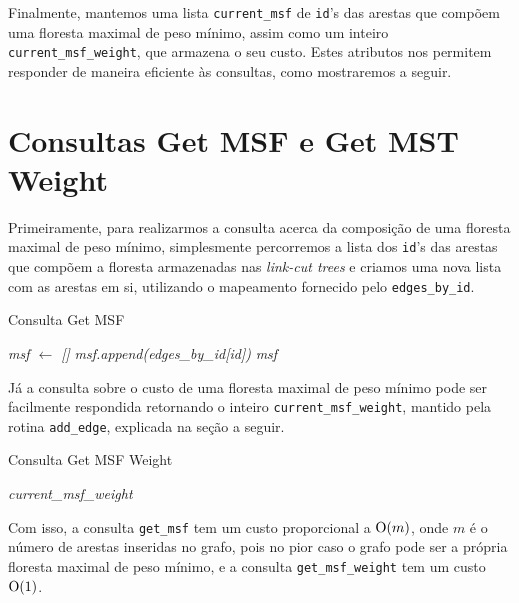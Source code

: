 Finalmente, mantemos uma lista \texttt{current\_msf} de \texttt{id}'s das arestas que compõem uma floresta maximal de peso mínimo, assim como um inteiro \texttt{current\_msf\_weight}, que armazena o seu custo. Estes atributos nos permitem responder de maneira eficiente às consultas, como mostraremos a seguir.

\section{Consultas Get MSF e Get MST Weight}
\label{sec:imsf-get-msf}

Primeiramente, para realizarmos a consulta acerca da composição de uma floresta maximal de peso mínimo, simplesmente percorremos a lista dos \texttt{id}'s das arestas que compõem a floresta armazenadas nas \emph{link-cut trees} e criamos uma nova lista com as arestas em si, utilizando o mapeamento fornecido pelo \texttt{edges\_by\_id}.

\begin{algorithm}[h!]
    \caption{Consulta Get MSF}\label{imsf-get-msf}
    \begin{algorithmic}[1]
        \State \emph{msf $\gets$ []}
        \State \emph{msf.append(edges\_by\_id[id])}
        \EndFor
        \State \Return \emph{msf}
        \EndFunction
    \end{algorithmic}
\end{algorithm}

Já a consulta sobre o custo de uma floresta maximal de peso mínimo pode ser facilmente respondida retornando o inteiro \texttt{current\_msf\_weight}, mantido pela rotina \texttt{add\_edge}, explicada na seção a seguir.

\begin{algorithm}[h!]
    \caption{Consulta Get MSF Weight}\label{imsf-get-msf-weight}
    \begin{algorithmic}[1]
        \State \Return \emph{current\_msf\_weight}
        \EndFunction
    \end{algorithmic}
\end{algorithm}

Com isso, a consulta \texttt{get\_msf} tem um custo proporcional a $\mathrm{O}(m)$, onde $m$ é o número de arestas inseridas no grafo, pois no pior caso o grafo pode ser a própria floresta maximal de peso mínimo, e a consulta \texttt{get\_msf\_weight} tem um custo $\mathrm{O}(1)$.

